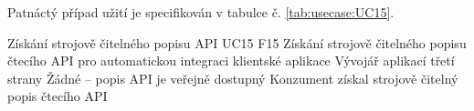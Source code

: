 
Patnáctý případ užití je specifikován v tabulce č. \ref{tab:usecase:UC15}.

\begin{UseCaseTable}
  {Získání strojově čitelného popisu API}
  {UC15}
  {F15}
  {Získání strojově čitelného popisu čtecího API pro automatickou integraci klientské aplikace}
  {Vývojář aplikací třetí strany}
  {}
  {Žádné -- popis API je veřejně dostupný}
  {Konzument získal strojově čitelný popis čtecího API}


\end{UseCaseTable}
